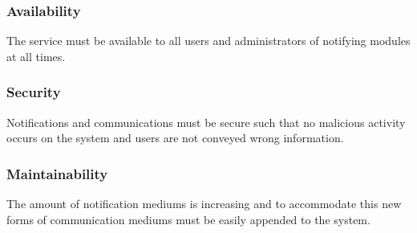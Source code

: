 \documentclass{article}
\begin{document}
    	\subsubsection{Availability}    
    \begin{flushleft}
The service must be available to all users and administrators of notifying modules at all times.
    \end{flushleft}
    
    	\subsubsection{Security}    
    \begin{flushleft}
    Notifications and communications must be secure such that no malicious activity occurs on the system and users are not conveyed wrong information.
    \end{flushleft}
    
    	\subsubsection{Maintainability}    
    \begin{flushleft}
    The amount of notification mediums is increasing and to accommodate this new forms of communication mediums must be easily appended to the system.
    \end{flushleft}
    
\end{document}
